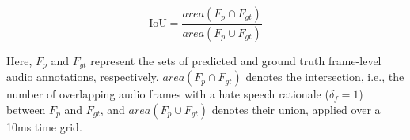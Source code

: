 \documentclass[11pt]{article}
\begin{document}

\begin{equation}
\label{eq:iou}
    \text{IoU} = \frac{area(F_p \cap F_{gt})}{area(F_p \cup F_{gt})}
\end{equation}

Here, $F_p$ and $F_{gt}$ represent the sets of predicted and ground truth frame-level audio annotations, respectively. $area(F_p \cap F_{gt})$ denotes the intersection, i.e., the number of overlapping audio frames with a hate speech rationale ($\delta_f=1$) between $F_p$ and $F_{gt}$, and $area(F_p \cup F_{gt})$ denotes their union, applied over a 10ms time grid.

\end{document}

